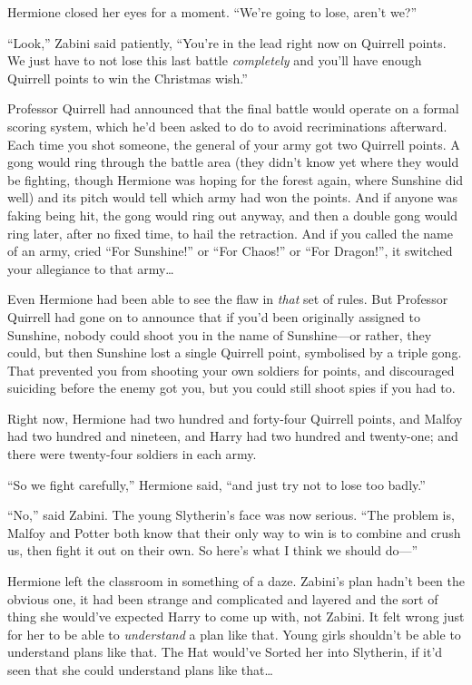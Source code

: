 Hermione closed her eyes for a moment. ``We're going to lose, aren't
we?''

``Look,'' Zabini said patiently, ``You're in the lead right now on
Quirrell points. We just have to not lose this last battle
\emph{completely} and you'll have enough Quirrell points to win the
Christmas wish.''

Professor Quirrell had announced that the final battle would operate on
a formal scoring system, which he'd been asked to do to avoid
recriminations afterward. Each time you shot someone, the general of
your army got two Quirrell points. A gong would ring through the battle
area (they didn't know yet where they would be fighting, though Hermione
was hoping for the forest again, where Sunshine did well) and its pitch
would tell which army had won the points. And if anyone was faking being
hit, the gong would ring out anyway, and then a double gong would ring
later, after no fixed time, to hail the retraction. And if you called
the name of an army, cried ``For Sunshine!'' or ``For Chaos!'' or ``For
Dragon!'', it switched your allegiance to that army\ldots{}

Even Hermione had been able to see the flaw in \emph{that} set of rules.
But Professor Quirrell had gone on to announce that if you'd been
originally assigned to Sunshine, nobody could shoot you in the name of
Sunshine---or rather, they could, but then Sunshine lost a single
Quirrell point, symbolised by a triple gong. That prevented you from
shooting your own soldiers for points, and discouraged suiciding before
the enemy got you, but you could still shoot spies if you had to.

Right now, Hermione had two hundred and forty-four Quirrell points, and
Malfoy had two hundred and nineteen, and Harry had two hundred and
twenty-one; and there were twenty-four soldiers in each army.

``So we fight carefully,'' Hermione said, ``and just try not to lose too
badly.''

``No,'' said Zabini. The young Slytherin's face was now serious. ``The
problem is, Malfoy and Potter both know that their only way to win is to
combine and crush us, then fight it out on their own. So here's what I
think we should do---''

Hermione left the classroom in something of a daze. Zabini's plan hadn't
been the obvious one, it had been strange and complicated and layered
and the sort of thing she would've expected Harry to come up with, not
Zabini. It felt wrong just for her to be able to \emph{understand} a
plan like that. Young girls shouldn't be able to understand plans like
that. The Hat would've Sorted her into Slytherin, if it'd seen that she
could understand plans like that\ldots{}


